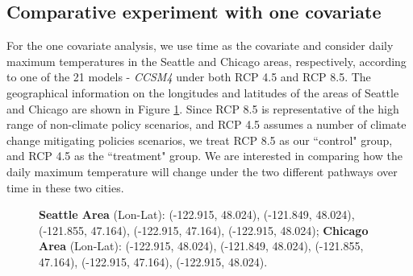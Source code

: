 \documentclass{statsoc}
\begin{document}
\subsection{Comparative experiment with one covariate}
For the one covariate analysis, we use time as the covariate and consider daily maximum temperatures in the Seattle and Chicago areas, respectively, according to one of the 21 models - {\it CCSM4} \citep{gent2011community} under both RCP 4.5 and RCP 8.5. The geographical information on the longitudes and latitudes of the areas of Seattle and Chicago are shown in Figure \ref{fig:Chicago}. Since RCP 8.5 is representative of the high range of non-climate policy scenarios, and RCP 4.5 assumes  a number of climate change mitigating policies scenarios, we treat RCP 8.5 as our ``control" group, and RCP 4.5 as the ``treatment" group. We are interested in comparing how the daily maximum temperature will change under the two different pathways over time in these two cities. 
\begin{figure}
\centering   
\caption{\textbf{Seattle Area} (Lon-Lat): (-122.915, 48.024), (-121.849, 48.024), (-121.855, 47.164), (-122.915, 47.164), (-122.915, 48.024); \textbf{Chicago Area} (Lon-Lat): (-122.915, 48.024), (-121.849, 48.024), (-121.855, 47.164), (-122.915, 47.164), (-122.915, 48.024).}
\label{fig:Chicago}
\end{figure}
\end{document}
